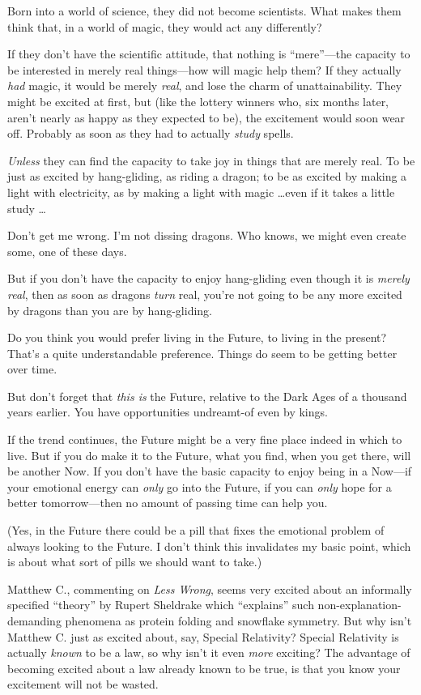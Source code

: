 {
 Born into a world of science, they did not become scientists. What
makes them think that, in a world of magic, they would act any
differently?}

{
 If they don't have the scientific attitude, that
nothing is ``mere''---the capacity
to be interested in merely real things---how will magic help them? If
they actually \textit{had} magic, it would be merely \textit{real}, and
lose the charm of unattainability. They might be excited at first, but
(like the lottery winners who, six months later, aren't
nearly as happy as they expected to be), the excitement would soon wear
off. Probably as soon as they had to actually \textit{study} spells.}

{
 \textit{Unless} they can find the capacity to take joy in things
that are merely real. To be just as excited by hang-gliding, as riding
a dragon; to be as excited by making a light with electricity, as by
making a light with magic \ldots even if it takes a little study \ldots}

{
 Don't get me wrong. I'm not
dissing dragons. Who knows, we might even create some, one of these
days.}

{
 But if you don't have the capacity to enjoy
hang-gliding even though it is \textit{merely real}, then as soon as
dragons \textit{turn} real, you're not going to be any
more excited by dragons than you are by hang-gliding.}

{
 Do you think you would prefer living in the Future, to living in
the present? That's a quite understandable preference.
Things do seem to be getting better over time.}

{
 But don't forget that \textit{this is} the Future,
relative to the Dark Ages of a thousand years earlier. You have
opportunities undreamt-of even by kings.}

{
 If the trend continues, the Future might be a very fine place
indeed in which to live. But if you do make it to the Future, what you
find, when you get there, will be another Now. If you
don't have the basic capacity to enjoy being in a
Now---if your emotional energy can \textit{only} go into the Future, if
you can \textit{only} hope for a better tomorrow---then no amount of
passing time can help you.}

{
 (Yes, in the Future there could be a pill that fixes the emotional
problem of always looking to the Future. I don't think
this invalidates my basic point, which is about what sort of pills we
should want to take.)}

{
 Matthew C., commenting on \textit{Less Wrong}, seems very excited
about an informally specified
``theory'' by Rupert Sheldrake which
``explains'' such
non-explanation-demanding phenomena as protein folding and snowflake
symmetry. But why isn't Matthew C. just as excited
about, say, Special Relativity? Special Relativity is actually
\textit{known} to be a law, so why isn't it even
\textit{more} exciting? The advantage of becoming excited about a law
already known to be true, is that you know your excitement will not be
wasted.}

